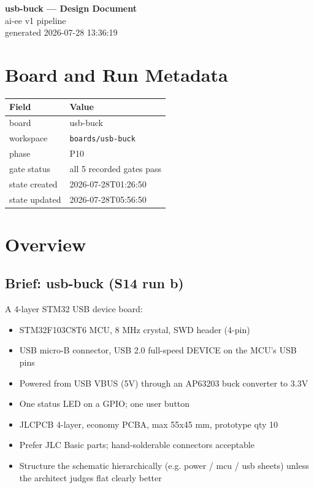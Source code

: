 \documentclass[11pt,a4paper]{article}
\begin{document}
\sloppy
\begin{center}
{\LARGE\bfseries usb-buck --- Design Document}\\[6pt]
{\large ai-ee v1 pipeline}\\[2pt]
generated 2026-07-28 13:36:19
\end{center}
\tableofcontents

\section{Board and Run Metadata}
{\small
\begin{longtable}{lp{11cm}}
\toprule
\textbf{Field} & \textbf{Value} \\
\midrule
\endhead
board & usb-buck \\
workspace & \texttt{boards/usb-buck} \\
phase & P10 \\
gate status & all 5 recorded gates pass \\
state created & 2026-07-28T01:26:50 \\
state updated & 2026-07-28T05:56:50 \\
\bottomrule
\end{longtable}
}
\section{Overview}
\subsection*{Brief: usb-buck (S14 run b)}
A 4-layer STM32 USB device board:

\begin{itemize}
\item STM32F103C8T6 MCU, 8 MHz crystal, SWD header (4-pin)
\item USB micro-B connector, USB 2.0 full-speed DEVICE on the MCU's USB pins
\item Powered from USB VBUS (5V) through an AP63203 buck converter to 3.3V
\item One status LED on a GPIO; one user button
\item JLCPCB 4-layer, economy PCBA, max 55x45 mm, prototype qty 10
\item Prefer JLC Basic parts; hand-solderable connectors acceptable
\item Structure the schematic hierarchically (e.g. power / mcu / usb sheets)
unless the architect judges flat clearly better
\end{itemize}
\end{document}
